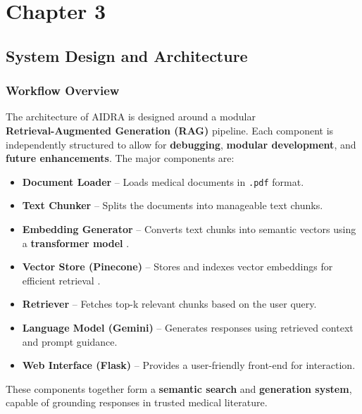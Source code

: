 \documentclass[12pt,a4paper]{report}
\newcommand{\titleKey}{AIDRA}
\begin{document}
	{\vfill \chapter*{\centering \vfill Chapter 3 \vfill}\vfill}
	\thispagestyle{empty}
	\newpage
	\label{System Design and Architecture}
	\section{System Design and Architecture}
	\label{Workflow Overview}
	\subsection{Workflow Overview}

The architecture of \titleKey{} is designed around a modular\\ \textbf{Retrieval-Augmented Generation (RAG)} pipeline. Each component is independently structured to allow for \textbf{debugging}, \textbf{modular development}, and \textbf{future enhancements}. The major components are:

\begin{itemize}
    \item \textbf{Document Loader} – Loads medical documents in \texttt{.pdf} format.
    \item \textbf{Text Chunker} – Splits the documents into manageable text chunks.
    \item \textbf{Embedding Generator} – Converts text chunks into semantic vectors using a \textbf{transformer model} \cite{sentence_transformers}.
    \item \textbf{Vector Store (Pinecone)} – Stores and indexes vector embeddings for efficient retrieval \cite{pinecone}.
    \item \textbf{Retriever} – Fetches top-k relevant chunks based on the user query.
    \item \textbf{Language Model (Gemini)} – Generates responses using retrieved context and prompt guidance.
    \item \textbf{Web Interface (Flask)} – Provides a user-friendly front-end for interaction.
\end{itemize}

These components together form a \textbf{semantic search} and \textbf{generation system}, capable of grounding responses in trusted medical literature.
\end{document}
